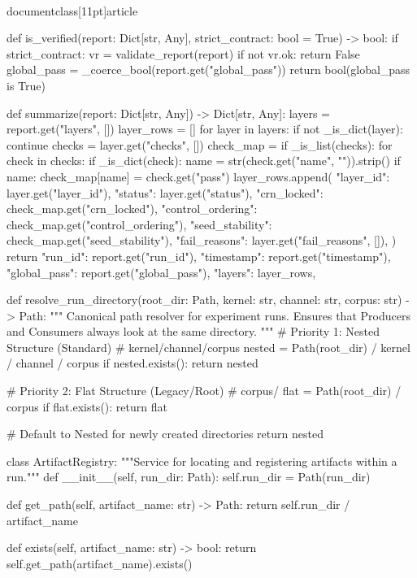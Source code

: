 \\documentclass[11pt]{article}
\begin{document}
\begin{CodeBlock}
def is_verified(report: Dict[str, Any], strict_contract: bool = True) -> bool:
    if strict_contract:
        vr = validate_report(report)
        if not vr.ok:
            return False
    global_pass = _coerce_bool(report.get("global_pass"))
    return bool(global_pass is True)


def summarize(report: Dict[str, Any]) -> Dict[str, Any]:
    layers = report.get("layers", [])
    layer_rows = []
    for layer in layers:
        if not _is_dict(layer):
            continue
        checks = layer.get("checks", [])
        check_map = {}
        if _is_list(checks):
            for check in checks:
                if _is_dict(check):
                    name = str(check.get("name", "")).strip()
                    if name:
                        check_map[name] = check.get("pass")
        layer_rows.append(
            {
                "layer_id": layer.get("layer_id"),
                "status": layer.get("status"),
                "crn_locked": check_map.get("crn_locked"),
                "control_ordering": check_map.get("control_ordering"),
                "seed_stability": check_map.get("seed_stability"),
                "fail_reasons": layer.get("fail_reasons", []),
            }
        )
    return {
        "run_id": report.get("run_id"),
        "timestamp": report.get("timestamp"),
        "global_pass": report.get("global_pass"),
        "layers": layer_rows,
    }

def resolve_run_directory(root_dir: Path, kernel: str, channel: str, corpus: str) -> Path:
    """
    Canonical path resolver for experiment runs.
    Ensures that Producers and Consumers always look at the same directory.
    """
    # Priority 1: Nested Structure (Standard)
    # kernel/channel/corpus
    nested = Path(root_dir) / kernel / channel / corpus
    if nested.exists():
        return nested
        
    # Priority 2: Flat Structure (Legacy/Root)
    # corpus/
    flat = Path(root_dir) / corpus
    if flat.exists():
        return flat
        
    # Default to Nested for newly created directories
    return nested

class ArtifactRegistry:
    """Service for locating and registering artifacts within a run."""
    def __init__(self, run_dir: Path):
        self.run_dir = Path(run_dir)
        
    def get_path(self, artifact_name: str) -> Path:
        return self.run_dir / artifact_name
        
    def exists(self, artifact_name: str) -> bool:
        return self.get_path(artifact_name).exists()

\end{CodeBlock}
\end{document}
